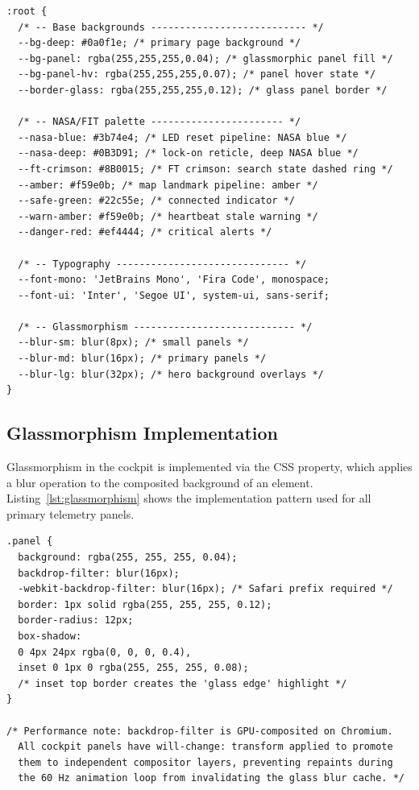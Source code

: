 \begin{lstlisting}[caption={CSS design-token color system}, label={lst:color-tokens}]
:root {
  /* -- Base backgrounds --------------------------- */
  --bg-deep: #0a0f1e; /* primary page background */
  --bg-panel: rgba(255,255,255,0.04); /* glassmorphic panel fill */
  --bg-panel-hv: rgba(255,255,255,0.07); /* panel hover state */
  --border-glass: rgba(255,255,255,0.12); /* glass panel border */

  /* -- NASA/FIT palette ----------------------- */
  --nasa-blue: #3b74e4; /* LED reset pipeline: NASA blue */
  --nasa-deep: #0B3D91; /* lock-on reticle, deep NASA blue */
  --ft-crimson: #8B0015; /* FT crimson: search state dashed ring */
  --amber: #f59e0b; /* map landmark pipeline: amber */
  --safe-green: #22c55e; /* connected indicator */
  --warn-amber: #f59e0b; /* heartbeat stale warning */
  --danger-red: #ef4444; /* critical alerts */

  /* -- Typography ------------------------------ */
  --font-mono: 'JetBrains Mono', 'Fira Code', monospace;
  --font-ui: 'Inter', 'Segoe UI', system-ui, sans-serif;

  /* -- Glassmorphism ---------------------------- */
  --blur-sm: blur(8px); /* small panels */
  --blur-md: blur(16px); /* primary panels */
  --blur-lg: blur(32px); /* hero background overlays */
}
\end{lstlisting}

\subsection{Glassmorphism Implementation}

Glassmorphism in the cockpit is implemented via the CSS  property, which applies a blur operation to the composited background of an element. Listing~\ref{lst:glassmorphism} shows the implementation pattern used for all primary telemetry panels.

\begin{lstlisting}[caption={Glassmorphic panel implementation}, label={lst:glassmorphism}]
.panel {
  background: rgba(255, 255, 255, 0.04);
  backdrop-filter: blur(16px);
  -webkit-backdrop-filter: blur(16px); /* Safari prefix required */
  border: 1px solid rgba(255, 255, 255, 0.12);
  border-radius: 12px;
  box-shadow:
  0 4px 24px rgba(0, 0, 0, 0.4),
  inset 0 1px 0 rgba(255, 255, 255, 0.08);
  /* inset top border creates the 'glass edge' highlight */
}

/* Performance note: backdrop-filter is GPU-composited on Chromium.
  All cockpit panels have will-change: transform applied to promote
  them to independent compositor layers, preventing repaints during
  the 60 Hz animation loop from invalidating the glass blur cache. */
\end{lstlisting}

